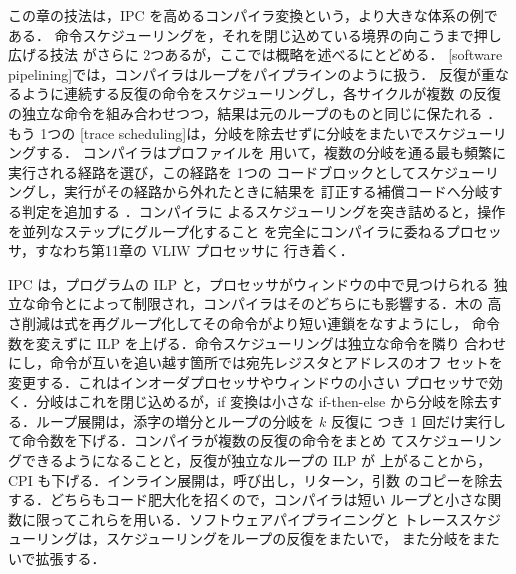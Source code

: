 \documentclass[../main.tex]{subfiles}
\begin{document}
この章の技法は，IPC を高めるコンパイラ変換という，より大きな体系の例で
ある．%
命令スケジューリングを，それを閉じ込めている境界の向こうまで押し広げる技法
がさらに 2つあるが，ここでは概略を述べるにとどめる．
%
[software pipelining]では，コンパイラはループをパイプラインのように扱う．
反復が重なるように連続する反復の命令をスケジューリングし，各サイクルが複数
の反復の独立な命令を組み合わせつつ，結果は元のループのものと同じに保たれる
\cite{lam1988}．もう 1つの
%
[trace scheduling]は，分岐を除去せずに分岐をまたいでスケジューリングする．
コンパイラはプロファイルを
用いて，複数の分岐を通る最も頻繁に実行される経路を選び，この経路を 1つの
コードブロックとしてスケジューリングし，実行がその経路から外れたときに結果を
訂正する補償コードへ分岐する判定を追加する \cite{fisher1981}．コンパイラに
よるスケジューリングを突き詰めると，操作を並列なステップにグループ化すること
を完全にコンパイラに委ねるプロセッサ，すなわち第11章の VLIW プロセッサに
行き着く．

\begin{keypoint}[章のまとめ]
  IPC は，プログラムの ILP と，プロセッサがウィンドウの中で見つけられる
  独立な命令とによって制限され，コンパイラはそのどちらにも影響する．木の
  高さ削減は式を再グループ化してその命令がより短い連鎖をなすようにし，
  命令数を変えずに ILP を上げる．命令スケジューリングは独立な命令を隣り
  合わせにし，命令が互いを追い越す箇所では宛先レジスタとアドレスのオフ
  セットを変更する．これはインオーダプロセッサやウィンドウの小さい
  プロセッサで効く．分岐はこれを閉じ込めるが，if 変換は小さな if-then-else
  から分岐を除去する．ループ展開は，添字の増分とループの分岐を $k$ 反復に
  つき 1 回だけ実行して命令数を下げる．コンパイラが複数の反復の命令をまとめ
  てスケジューリングできるようになることと，反復が独立なループの ILP が
  上がることから，CPI も下げる．インライン展開は，呼び出し，リターン，引数
  のコピーを除去する．どちらもコード肥大化を招くので，コンパイラは短い
  ループと小さな関数に限ってこれらを用いる．ソフトウェアパイプライニングと
  トレーススケジューリングは，スケジューリングをループの反復をまたいで，
  また分岐をまたいで拡張する．
\end{keypoint}
\end{document}
